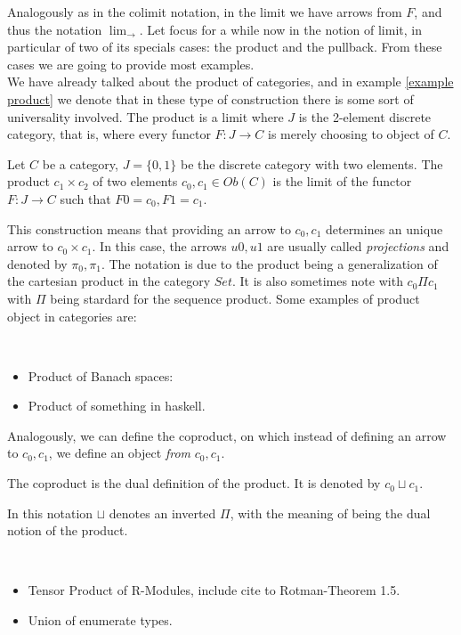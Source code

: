 Analogously as in the colimit notation, in the limit we have arrows from $F$, and thus the notation $\lim_{\rightarrow}$. Let focus for a while now in the notion of limit, in particular of two of its specials cases: the product and the pullback. From these cases we are going to provide most examples. \\

We have already talked about the product of categories, and in example \ref{example product} we denote that in these type of construction there is some sort of universality involved. The product is a limit where $J$ is the 2-element discrete category, that is, where every functor $F:J\to C$ is merely choosing to object of $C$. 

\begin{definition}\label{prod-univ}
  Let $C$ be a category, $J=\{0,1\}$ be the discrete category with two elements. The product $c_1\times c_2$ of two elements $c_0,c_1\in Ob(C)$ is the limit of the functor $F:J\to C$ such that $F0 = c_0, F1= c_1$.
\end{definition}

This construction means that providing an arrow to $c_0,c_1$ determines an unique arrow to $c_0\times c_1$. In this case, the arrows $u0, u1$ are usually called \emph{projections} and denoted by $\pi_0, \pi_1$. The notation is due to the product being a generalization of the cartesian product in the category $Set$. It is also sometimes note with $c_0 \Pi c_1$ with $\Pi$ being stardard for the sequence product. Some examples of product object in categories are:
\begin{example}\ 
\begin{itemize}
\item Product of Banach spaces:
\item Product of something in haskell.
\end{itemize}
\end{example}

Analogously, we can define the coproduct, on which instead of defining an arrow to $c_0, c_1$, we define an object \emph{from} $c_0,c_1$. 
\begin{definition}
  The coproduct is the dual definition of the product. It is denoted by $c_0 \sqcup c_1$.
\end{definition}
 In this notation $\sqcup$ denotes an inverted $\Pi$, with the meaning of being the dual notion of the product.
\begin{example}\ 
  \begin{itemize}
  \item Tensor Product of R-Modules, include cite to Rotman-Theorem 1.5.
  \item Union of enumerate types.
  \end{itemize}
\end{example}



